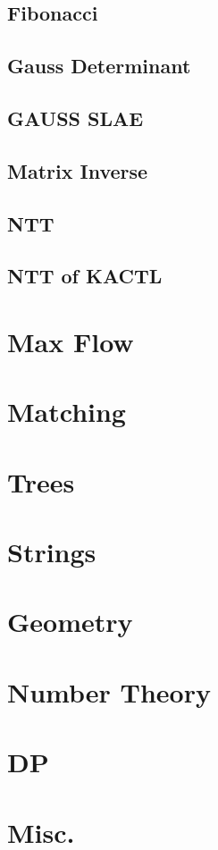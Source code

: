 \subsection{Fibonacci}
\raggedbottom
\hrulefill
\subsection{Gauss Determinant}
\raggedbottom
\hrulefill
\subsection{GAUSS SLAE}
\raggedbottom
\hrulefill
\subsection{Matrix Inverse}
\raggedbottom
\hrulefill
\subsection{NTT}
\raggedbottom
\hrulefill
\subsection{NTT of KACTL}
\raggedbottom
\hrulefill

\section{Max Flow}

\section{Matching}

\section{Trees}

\section{Strings}

\section{Geometry}

\section{Number Theory}

\section{DP}

\section{Misc.}

